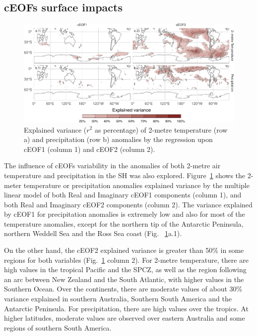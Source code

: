 \documentclass[smallextended]{svjour3}       %
\begin{document}
\hypertarget{precipitation}{%
\subsection{cEOFs surface impacts}\label{precipitation}}

\begin{figure}
\centering
\includegraphics{../figures/pp-t2m-r2-1.pdf}
\caption{\label{fig:pp-t2m-r2}Explained variance (\(r^2\) as percentage) of 2-metre temperature (row a) and precipitation (row b) anomalies by the regression upon cEOF1 (column 1) and cEOF2 (column 2).}
\end{figure}



The influence of cEOFs variability in the anomalies of both 2-metre air temperature and precipitation in the SH was also explored.
Figure~\ref{fig:pp-t2m-r2} shows the 2-meter temperature or precipitation anomalies explained variance by the multiple linear model of both Real and Imaginary cEOF1 components (column 1), and both Real and Imaginary cEOF2 components (column 2).
The variance explained by cEOF1 for precipitation anomalies is extremely low and also for most of the temperature anomalies, except for the northern tip of the Antarctic Peninsula, northern Weddell Sea and the Ross Sea coast (Fig.~ \ref{fig:pp-t2m-r2}a.1).

On the other hand, the cEOF2 explained variance is greater than 50\% in some regions for both variables (Fig.~\ref{fig:pp-t2m-r2} column 2).
For 2-metre temperature, there are high values in the tropical Pacific and the SPCZ, as well as the region following an arc between New Zealand and the South Atlantic, with higher values in the Southern Ocean.
Over the continents, there are moderate values of about 30\% variance explained in southern Australia, Southern South America and the Antarctic Peninsula.
For precipitation, there are high values over the tropics. At higher latitudes, moderate values are observed over eastern Australia and some regions of southern South America.
\end{document}
